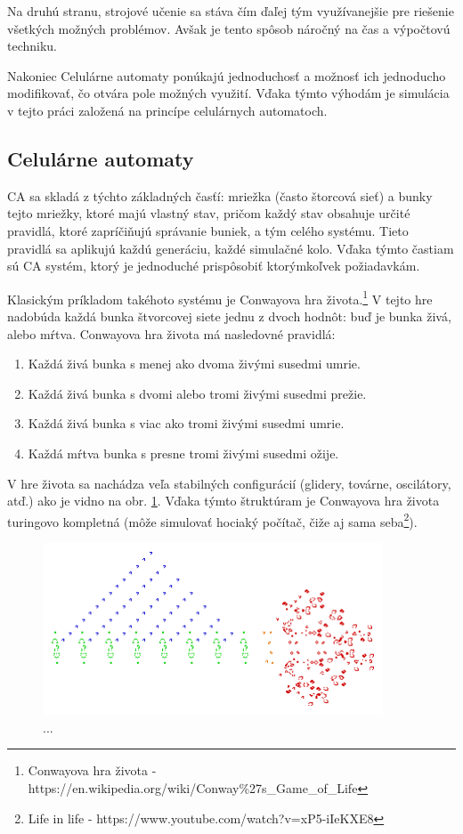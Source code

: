 \documentclass[12pt]{article}
\begin{document}
Na druhú stranu, strojové učenie sa stáva čím ďaľej tým využívanejšie pre
riešenie všetkých možných problémov. Avšak je tento spôsob náročný na čas
a výpočtovú techniku.

Nakoniec Celulárne automaty ponúkajú jednoduchosť a možnosť ich jednoducho
modifikovať, čo otvára pole možných využití. Vďaka týmto výhodám je simulácia
v tejto práci založená na princípe celulárnych automatoch.

\newpage
\subsection{Celulárne automaty}

CA sa skladá z týchto základných časťí: mriežka (často štorcová sieť)
a bunky tejto mriežky, ktoré majú vlastný stav, pričom každý stav obsahuje
určité pravidlá, ktoré zapríčiňujú správanie buniek, a tým celého systému.
Tieto pravidlá sa aplikujú každú generáciu, každé simulačné kolo.
Vďaka týmto častiam sú CA systém, ktorý je jednoduché prispôsobiť ktorýmkoľvek
požiadavkám.

Klasickým príkladom takéhoto systému je Conwayova hra života.\footnote
{Conwayova hra života - https://en.wikipedia.org/wiki/Conway\%27s\_Game\_of\_Life}
V tejto hre nadobúda každá bunka štvorcovej siete jednu z dvoch hodnôt:
buď je bunka živá, alebo mŕtva. Conwayova hra života má nasledovné pravidlá:

\begin{enumerate}
	\item Každá živá bunka s menej ako dvoma živými susedmi umrie.
	\item Každá živá bunka s dvomi alebo tromi živými susedmi prežie.
	\item Každá živá bunka s viac ako tromi živými susedmi umrie.
	\item Každá mŕtva bunka s presne tromi živými susedmi ožije.
\end{enumerate}

V hre života sa nachádza veľa stabilných configurácií (glidery, továrne,
oscilátory, atď.) ako je vidno na obr. \ref{obr:conwayova hra zivota}.
Vďaka týmto štruktúram je Conwayova hra života turingovo kompletná (môže
simulovať hociaký počítač, čiže aj sama seba\footnote
{Life in life - https://www.youtube.com/watch?v=xP5-iIeKXE8}).

\begin{figure}[h]
	\centering
	\includegraphics[width=0.9\textwidth]{res/Conways_game_of_life_breeder.png}
	\caption{...}
	\label{obr:conwayova hra zivota}
\end{figure}
\end{document}
